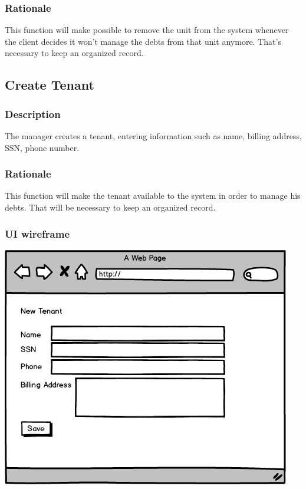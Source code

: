 \documentclass{scrreprt}
\begin{document}
\subsubsection{Rationale}

This function will make possible to remove the unit from the system whenever the client decides it won't manage the debts from that unit anymore. That's necessary to keep an organized record.

\subsection{Create Tenant}
\subsubsection{Description}

The manager creates a tenant, entering information such as name, billing address, SSN, phone number.

\subsubsection{Rationale}

This function will make the tenant available to the system in order to manage his debts. That will be necessary to keep an organized record.

\subsubsection{UI wireframe}
\includegraphics[scale=0.60]{mockups/createtenant.png}
\end{document}
